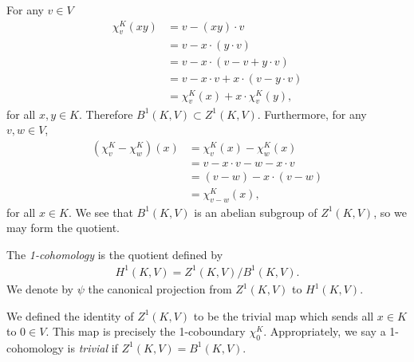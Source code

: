 For any $v \in V$
\begin{align*}
	\chi^K_v(xy) &=  v - (xy)\cdot v \\
	&=  v - x \cdot \left(y\cdot v \right)\\
	&=  v - x \cdot \left(v -v + y\cdot v \right)\\
	&=  v - x\cdot v + x\cdot \left( v - y\cdot v\right)\\
	&=  \chi^K_v(x) + x\cdot \chi^K_v(y),
\end{align*}
for all $x, y \in K$. Therefore $B^1(K, V) \subset Z^1(K, V)$.
Furthermore, for any $v, w \in V$,
\begin{align*}
	(\chi^K_v - \chi^K_w)(x) &=  \chi^K_v(x) - \chi^K_w(x)\\
	&=  v - x \cdot v - w - x\cdot v \\
	&=  (v - w) - x\cdot (v - w) \\
	&=  \chi^K_{v - w} (x),
\end{align*}
for all $x \in K$. We see that $B^1\left(K, V\right)$ is an abelian subgroup of $Z^1(K, V)$, so we may form the quotient.
\begin{definition} The \emph{1-cohomology} is the quotient defined by
\begin{align*}
	H^1\left(K, V\right) = Z^1\left(K, V\right) / B^1\left(K, V\right).
\end{align*}
We denote by $\psi$ the canonical projection from $Z^1(K, V)$ to $H^1(K, V)$.
\end{definition}

\begin{remark}\label{identity}
	We defined the identity of $Z^1(K, V)$ to be the trivial map which sends all $x \in K$ to $0 \in V$. This map is precisely the 1-coboundary $\chi^K_0$. Appropriately, we say a 1-cohomology is \emph{trivial} if $Z^1(K, V) = B^1(K, V)$.
\end{remark}

